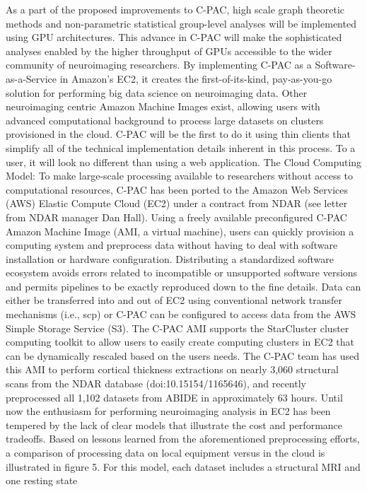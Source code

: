 \documentclass[1p,11pt]{elsarticle}
\begin{document}
As a
part of the proposed improvements to C-PAC, high scale graph theoretic
methods and non-parametric statistical group-level analyses will be
implemented using GPU architectures. This advance in C-PAC will make the
sophisticated analyses enabled by the higher throughput of GPUs
accessible to the wider community of neuroimaging researchers.  By
implementing C-PAC as a Software-as-a-Service in Amazon’s EC2, it
creates the first-of-its-kind, pay-as-you-go solution for performing big
data science on neuroimaging data. Other neuroimaging centric Amazon
Machine Images exist, allowing users with advanced computational
background to process large datasets on clusters provisioned in the
cloud. C-PAC will be the first to do it using thin clients that simplify
all of the technical implementation details inherent in this process. To
a user, it will look no different than using a web application.  The
Cloud Computing Model: To make large-scale processing available to
researchers without access to computational resources, C-PAC has been
ported to the Amazon Web Services (AWS) Elastic Compute Cloud (EC2)
under a contract from NDAR (see letter from NDAR manager Dan Hall).
Using a freely available preconfigured C-PAC Amazon Machine Image (AMI,
a virtual machine), users can quickly provision a computing system and
preprocess data without having to deal with software installation or
hardware configuration. Distributing a standardized software ecosystem
avoids errors related to incompatible or unsupported software versions
and permits pipelines to be exactly reproduced down to the fine details.
Data can either be transferred into and out of EC2 using conventional
network transfer mechanisms (i.e., scp) or C-PAC can be configured to
access data from the AWS Simple Storage Service (S3). The C-PAC AMI
supports the StarCluster cluster computing toolkit to allow users to
easily create computing clusters in EC2 that can be dynamically rescaled
based on the users needs. The C-PAC team has used this AMI to perform
cortical thickness extractions on nearly 3,060 structural scans from the
NDAR database (doi:10.15154/1165646), and recently preprocessed all
1,102 datasets from ABIDE in approximately 63 hours.  Until now the
enthusiasm for performing neuroimaging analysis in EC2 has been tempered
by the lack of clear models that illustrate the cost and performance
tradeoffs. Based on lessons learned from the aforementioned
preprocessing efforts, a comparison of processing data on local
equipment versus in the cloud is illustrated in figure 5. For this
model, each dataset includes a structural MRI and one resting state
\end{document}

